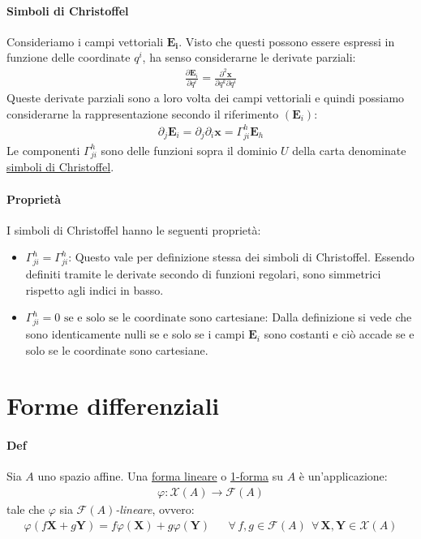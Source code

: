 \paragraph{Simboli di Christoffel} Consideriamo i campi vettoriali $\mathbf{E_i}$. Visto che questi possono essere espressi in funzione delle coordinate $q^i$, ha senso considerarne le derivate parziali:
\begin{align*}
    \frac{\partial \mathbf{E}_i}{\partial q^i}=\frac{\partial^2\mathbf{x}}{\partial q^k\partial q^i}
\end{align*}
Queste derivate parziali sono a loro volta dei campi vettoriali e quindi possiamo considerarne la rappresentazione secondo il riferimento $(\mathbf{E}_i)$:
\begin{align*}
    \partial_j\mathbf{E}_i=\partial_j\partial_i\mathbf{x}=\Gamma^h_{ji}\mathbf{E}_h
\end{align*}
Le componenti $\Gamma^h_{ji}$ sono delle funzioni sopra il dominio $U$ della carta denominate \underline{simboli di Christoffel}.
\paragraph{Proprietà} I simboli di Christoffel hanno le seguenti proprietà:
\begin{itemize}
    \item $\boxed{\Gamma^h_{ji}=\Gamma^h_{ji}}$: Questo vale per definizione stessa dei simboli di Christoffel. Essendo definiti tramite le derivate secondo di funzioni regolari, sono simmetrici rispetto agli indici in basso.
    \item $\boxed{\Gamma^h_{ji}=0\text{ se e solo se le coordinate sono cartesiane}}$: Dalla definizione si vede che sono identicamente nulli se e solo se i campi $\mathbf{E}_i$ sono costanti e ciò accade se e solo se le coordinate sono cartesiane.
\end{itemize}


\section{Forme differenziali}
\paragraph{Def} Sia $A$ uno spazio affine. Una \underline{forma lineare} o \underline{1-forma} su $A$ è un'applicazione:
\begin{align*}
    \varphi \colon \mathcal{X}(A)\to \mathcal{F}(A)
\end{align*}
tale che $\varphi$ sia \textit{$\mathcal{F}(A)$-lineare}, ovvero:
\begin{align*}
    \varphi(f\mathbf{X}+g\mathbf{Y})=f\varphi(\mathbf{X})+g\varphi(\mathbf{Y})&& \forall\, f,g\in \mathcal{F}(A)\:\:\forall \, \mathbf{X},\mathbf{Y}\in \mathcal{X}(A)
\end{align*}
